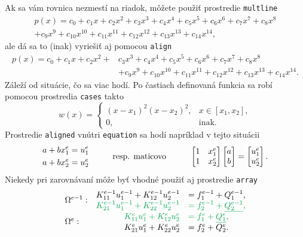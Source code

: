 Ak sa vám rovnica nezmestí na riadok, môžete použiť prostredie \verb|multline|
\begin{multline}
	p(x) = c_0+c_1x+c_2x^2+c_3x^3+c_4x^4+c_5x^5+c_6x^6+c_7x^7+c_8x^8\\ 
	+c_9x^9+c_{10}x^{10}+c_{11}x^{11}+c_{12}x^{12}+c_{13}x^{13}+c_{14}x^{14},
\end{multline}
ale dá sa to (inak) vyriešiť aj pomocou \verb|align|
\begin{align}
	p(x) = c_0+c_1x+c_2x^2+&c_3x^3+c_4x^4+c_5x^5+c_6x^6+c_7x^7+c_8x^8 \nonumber\\ 
	&+c_9x^9+c_{10}x^{10}+c_{11}x^{11}+c_{12}x^{12}+c_{13}x^{13}+c_{14}x^{14}. \label{eq:long_equation}
\end{align}
Záleží od situácie, čo sa viac hodí. Po častiach definovaná funkcia sa robí pomocou prostredia \verb|cases| takto
\begin{equation*}
	w(x)=
	\begin{cases}
		(x-x_1)^2(x-x_2)^2,& x\in[x_1,x_2],\\
		0,& \mbox{inak}.
	\end{cases}
\end{equation*}
Prostredie \verb|aligned| vnútri \verb|equation| sa hodí napríklad v tejto situácii
\begin{equation}
	\begin{aligned}
		a + b x_1^e&=u_1^e\\
		a + b x_2^e&= u_2^e
	\end{aligned}
	\hskip 1cm \mbox{resp. maticovo} \hskip 1cm 
	\begin{bmatrix}
		1 & x_1^e \\ 
		1 & x_2^e
	\end{bmatrix}
	\begin{bmatrix}
		a  \\ 
		b 
	\end{bmatrix}=
	\begin{bmatrix}
		u_1^e  \\ 
		u_2^e 
	\end{bmatrix}.
\end{equation}
Niekedy pri zarovnávaní môže byť vhodné použiť aj prostredie \verb|array|
\begin{align*}
	\begin{array}{lrl}
		\text{\multirow{2}{*}{$\Omega^{e-1}:$}} & K_{11}^{e-1} u_1^{e-1} + K_{12}^{e-1} u_2^{e-1} & = f_1^{e-1} + Q_1^{e-1}, \\
		& \color{Green} K_{21}^{e-1} u_1^{e-1} + K_{22}^{e-1} u_2^{e-1} & \color{Green}= f_2^{e-1} + \underline{Q_2^{e-1}}, \\
		\text{\multirow{2}{*}{$\Omega^e:$}} & \color{Green}K_{11}^e u_1^e + K_{12}^e u_2^e & \color{Green}= f_1^e + \underline{Q_1^e}, \\
		& K_{21}^e u_1^e + K_{22}^e u_2^e & = f_2^e + Q_2^e.
	\end{array}
\end{align*}
